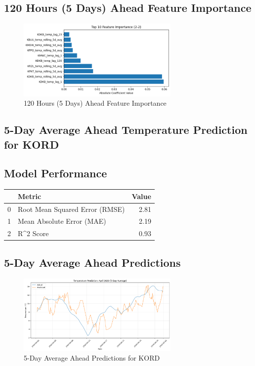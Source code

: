 \subsection{120 Hours (5 Days) Ahead Feature Importance}
\begin{figure}[htbp]
\centering
\includegraphics[width=0.7\textwidth]{2-2-gradient_boost_temp_shift_feature_importance.png}
\caption{120 Hours (5 Days) Ahead Feature Importance}
\label{fig:120_hours_(5_days)_ahead_featimp}
\end{figure}



\subsection{5-Day Average Ahead Temperature Prediction for KORD}
\subsection{Model Performance}
\begin{tabular}{llr}
\toprule
 & Metric & Value \\
\midrule
0 & Root Mean Squared Error (RMSE) & 2.81 \\
1 & Mean Absolute Error (MAE) & 2.19 \\
2 & R^2 Score & 0.93 \\
\bottomrule
\end{tabular}

\subsection{5-Day Average Ahead Predictions}
\begin{figure}[htbp]
\centering
\includegraphics[width=0.7\textwidth]{2-3-gradient_boost_temp_shift_results.png}
\caption{5-Day Average Ahead Predictions for KORD}
\label{fig:5-day_average_ahead_pred}
\end{figure}

